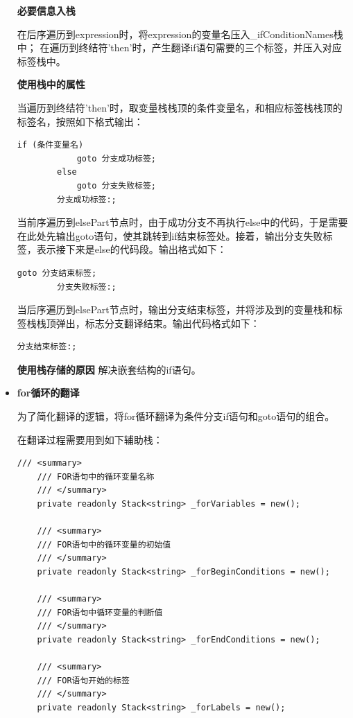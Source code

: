 \documentclass[../main.tex]{subfiles}
\begin{document}
\begin{itemize}
    \textbf{必要信息入栈}
    
    在后序遍历到expression时，将expression的变量名压入\_ifConditionNames栈中；
    在遍历到终结符'then'时，产生翻译if语句需要的三个标签，并压入对应标签栈中。

    \textbf{使用栈中的属性}

    当遍历到终结符'then'时，取变量栈栈顶的条件变量名，和相应标签栈栈顶的标签名，按照如下格式输出：
    \begin{lstlisting}[style = c]
        if (条件变量名) 
            goto 分支成功标签;
        else 
            goto 分支失败标签;
        分支成功标签:;
    \end{lstlisting}

    当前序遍历到elsePart节点时，由于成功分支不再执行else中的代码，于是需要在此处先输出goto语句，使其跳转到if结束标签处。接着，输出分支失败标签，表示接下来是else的代码段。输出格式如下：
    \begin{lstlisting}[style = c]
        goto 分支结束标签;
        分支失败标签:;
    \end{lstlisting}

    当后序遍历到elsePart节点时，输出分支结束标签，并将涉及到的变量栈和标签栈栈顶弹出，标志分支翻译结束。输出代码格式如下：
    \begin{lstlisting}[style = c]
        分支结束标签:;
    \end{lstlisting}

    \textbf{使用栈存储的原因 } 解决嵌套结构的if语句。
    
    \item \textbf{for循环的翻译}
    
    为了简化翻译的逻辑，将for循环翻译为条件分支if语句和goto语句的组合。
    
    在翻译过程需要用到如下辅助栈：

    \begin{lstlisting}[style = csharp]
     /// <summary>
    /// FOR语句中的循环变量名称
    /// </summary>
    private readonly Stack<string> _forVariables = new();
    
    /// <summary>
    /// FOR语句中的循环变量的初始值
    /// </summary>
    private readonly Stack<string> _forBeginConditions = new();
    
    /// <summary>
    /// FOR语句中循环变量的判断值
    /// </summary>
    private readonly Stack<string> _forEndConditions = new();
    
    /// <summary>
    /// FOR语句开始的标签
    /// </summary>
    private readonly Stack<string> _forLabels = new();
    

\end{lstlisting}
\end{itemize}
\end{document}
